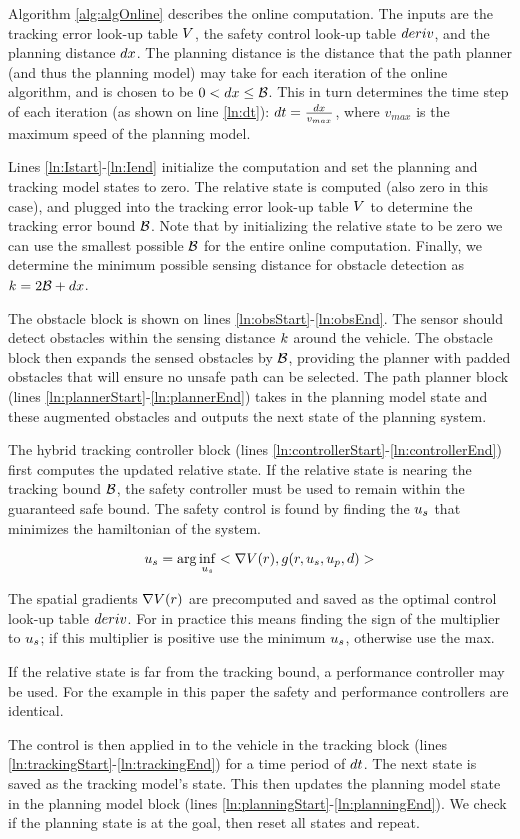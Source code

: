Algorithm \ref{alg:algOnline} describes the online computation. The inputs are the tracking error look-up table $V$, the safety control look-up table $deriv$, and the planning distance $dx$. The planning distance is the distance that the path planner (and thus the planning model) may take for each iteration of the online algorithm, and is chosen to be $0< dx \leq \mathcal B$. This in turn determines the time step of each iteration (as shown on line \ref{ln:dt}): $dt = \frac{dx}{v_{max}}$, where $v_{max}$ is the maximum speed of the planning model.

Lines \ref{ln:Istart}-\ref{ln:Iend} initialize the computation and set the planning and tracking model states to zero. The relative state is computed (also zero in this case), and plugged into the tracking error look-up table $V$ to determine the tracking error bound $\mathcal B$. Note that by initializing the relative state to be zero we can use the smallest possible $\mathcal B$ for the entire online computation. Finally, we determine the minimum possible sensing distance for obstacle detection as $k = 2\mathcal B + dx$.

The obstacle block is shown on lines \ref{ln:obsStart}-\ref{ln:obsEnd}. The sensor should detect obstacles within the sensing distance $k$ around the vehicle. The obstacle block then expands the sensed obstacles by $\mathcal B$, providing the planner with padded obstacles that will ensure no unsafe path can be selected. The path planner block (lines \ref{ln:plannerStart}-\ref{ln:plannerEnd}) takes in the planning model state and these augmented obstacles and outputs the next state of the planning system.

The hybrid tracking controller block (lines \ref{ln:controllerStart}-\ref{ln:controllerEnd}) first computes the updated relative state. If the relative state is nearing the tracking bound $\mathcal B$, the safety controller must be used to remain within the guaranteed safe bound. The safety control is found by finding the $u_s$ that minimizes the hamiltonian of the system.

\begin{equation}
	u_s = \arg\inf_{u_s} <\nabla V(r),g(r,u_s,u_p,d)>
\end{equation}

The spatial gradients $\nabla V(r)$ are precomputed and saved as the optimal control look-up table $deriv$. For  in practice this means finding the sign of the multiplier to $u_s$; if this multiplier is positive use the minimum $u_s$, otherwise use the max.

If the relative state is far from the tracking bound, a performance controller may be used. For the example in this paper the safety and performance controllers are identical.

The control is then applied in to the vehicle in the tracking block (lines \ref{ln:trackingStart}-\ref{ln:trackingEnd}) for a time period of $dt$. The next state is saved as the tracking model's state. This then updates the planning model state in the planning model block (lines \ref{ln:planningStart}-\ref{ln:planningEnd}). We check if the planning state is at the goal, then reset all states and repeat.


